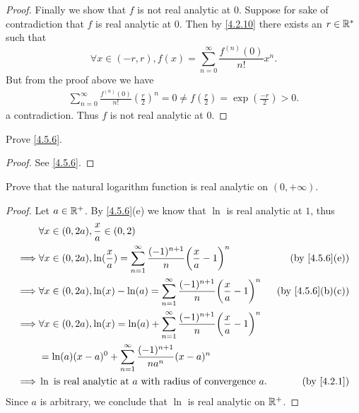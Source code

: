 \begin{proof}
  Finally we show that \(f\) is not real analytic at \(0\).
  Suppose for sake of contradiction that \(f\) is real analytic at \(0\).
  Then by \cref{4.2.10} there exists an \(r \in \mathbb{R}^*\) such that
  \[
    \forall x \in (-r, r), f(x) = \sum_{n = 0}^\infty \frac{f^{(n)}(0)}{n!} x^n.
  \]
  But from the proof above we have
  \begin{align*}
    \sum_{n = 0}^\infty \frac{f^{(n)}(0)}{n!} (\frac{r}{2})^n = 0 \neq f(\frac{r}{2}) = \exp(\frac{-r}{2}) > 0.
  \end{align*}
  a contradiction.
  Thus \(f\) is not real analytic at \(0\).
\end{proof}

\begin{ex}\label{ex:4.5.5}
  Prove \cref{4.5.6}.
\end{ex}

\begin{proof}
  See \cref{4.5.6}.
\end{proof}

\begin{ex}\label{ex:4.5.6}
  Prove that the natural logarithm function is real analytic on \((0, +\infty)\).
\end{ex}

\begin{proof}
  Let \(a \in \mathbb{R}^+\).
  By \cref{4.5.6}(e) we know that \(\ln\) is real analytic at \(1\), thus
  \begin{align*}
             & \forall x \in (0, 2a), \frac{x}{a} \in (0, 2)                                                                                                       \\
    \implies & \forall x \in (0, 2a), \ln(\frac{x}{a}) = \sum_{n = 1}^\infty \frac{(-1)^{n + 1}}{n} \bigg(\frac{x}{a} - 1\bigg)^n & \text{(by \cref{4.5.6}(e))}    \\
    \implies & \forall x \in (0, 2a), \ln(x) - \ln(a) = \sum_{n = 1}^\infty \frac{(-1)^{n + 1}}{n} \bigg(\frac{x}{a} - 1\bigg)^n  & \text{(by \cref{4.5.6}(b)(c))} \\
    \implies & \forall x \in (0, 2a), \ln(x) = \ln(a) + \sum_{n = 1}^\infty \frac{(-1)^{n + 1}}{n} \bigg(\frac{x}{a} - 1\bigg)^n                                   \\
             & = \ln(a) (x - a)^0 + \sum_{n = 1}^\infty \frac{(-1)^{n + 1}}{n a^n} (x - a)^n                                                                       \\
    \implies & \ln \text{ is real analytic at } a \text{ with radius of convergence } a.                                          & \text{(by \cref{4.2.1})}
  \end{align*}
  Since \(a\) is arbitrary, we conclude that \(\ln\) is real analytic on \(\mathbb{R}^+\).
\end{proof}

